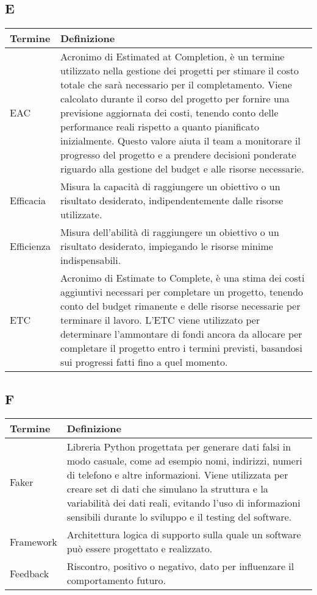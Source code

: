 \documentclass[10pt]{article}
\begin{document}
\subsection{E} %
\begin{longtable}{|>{\centering\arraybackslash}m{2.5cm}|>{\arraybackslash}m{12.5cm}|}
\hline
\rowcolor[gray]{0.8}
\textbf{Termine} & \textbf{Definizione}\\
\endhead
\hline
EAC & Acronimo di Estimated at Completion, è un termine utilizzato nella gestione dei progetti per stimare il costo totale che sarà necessario per il completamento. Viene calcolato durante il corso del progetto per fornire una previsione aggiornata dei costi, tenendo conto delle performance reali rispetto a quanto pianificato inizialmente. Questo valore aiuta il team a monitorare il progresso del progetto e a prendere decisioni ponderate riguardo alla gestione del budget e alle risorse necessarie.\\
\hline
Efficacia & Misura la capacità di raggiungere un obiettivo o un risultato desiderato, indipendentemente dalle risorse utilizzate.\\
\hline
Efficienza & Misura dell'abilità di raggiungere un obiettivo o un risultato desiderato, impiegando le risorse minime indispensabili.\\
\hline
ETC & Acronimo di Estimate to Complete, è una stima dei costi aggiuntivi necessari per completare un progetto, tenendo conto del budget rimanente e delle risorse necessarie per terminare il lavoro. L'ETC viene utilizzato per determinare l'ammontare di fondi ancora da allocare per completare il progetto entro i termini previsti, basandosi sui progressi fatti fino a quel momento.\\
\hline
\end{longtable}

\subsection{F} %
\begin{longtable}{|>{\centering\arraybackslash}m{2.5cm}|>{\arraybackslash}m{12.5cm}|}
\hline
\rowcolor[gray]{0.8}
\textbf{Termine} & \textbf{Definizione}\\
\endhead
\hline
Faker & Libreria Python progettata per generare dati falsi in modo casuale, come ad esempio nomi, indirizzi, numeri di telefono e altre informazioni. Viene utilizzata per creare set di dati che simulano la struttura e la variabilità dei dati reali, evitando l'uso di informazioni sensibili durante lo sviluppo e il testing del software.\\
\hline
Framework & Architettura logica di supporto sulla quale un software può essere progettato e realizzato.\\
\hline
Feedback & Riscontro, positivo o negativo, dato per influenzare il comportamento futuro.\\
\hline
\end{longtable}
\end{document}

